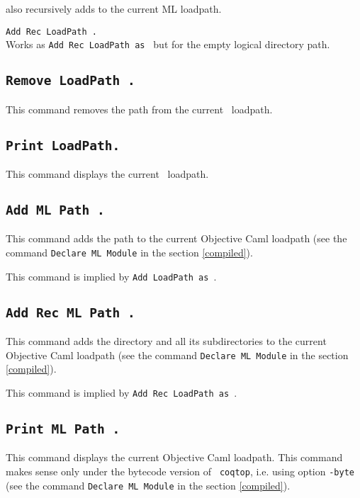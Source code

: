  also recursively adds {\str} to the current ML loadpath.

\begin{Variants}
\item {\tt Add Rec LoadPath {\str}.}\\
Works as {\tt Add Rec LoadPath {\str} as {\dirpath}} but for the empty logical directory path.
\end{Variants}

\subsection{\tt Remove LoadPath {\str}.}
This command removes the path {\str} from the current \Coq\ loadpath.

\subsection{\tt Print LoadPath.}
This command displays the current \Coq\ loadpath.

\subsection{\tt Add ML Path {\str}.}
This command adds the path {\str} to the current Objective Caml loadpath (see
the command {\tt Declare ML Module} in the section \ref{compiled}).

\Rem This command is implied by {\tt Add LoadPath {\str} as {\dirpath}}.

\subsection{\tt Add Rec ML Path {\str}.}
This command adds the directory {\str} and all its subdirectories 
to the current Objective Caml loadpath (see
the command {\tt Declare ML Module} in the section \ref{compiled}).

\Rem This command is implied by {\tt Add Rec LoadPath {\str} as {\dirpath}}.

\subsection{\tt Print ML Path {\str}.}
This command displays the current Objective Caml loadpath.
This command makes sense only under the bytecode version of {\tt
coqtop}, i.e. using option {\tt -byte} (see the
command {\tt Declare ML Module} in the section
\ref{compiled}).

